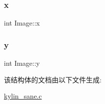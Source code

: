 \mbox{\label{structImage_a7f8f4530212c93856e611030e46c82af}} 
\subsubsection{\texorpdfstring{x}{x}}
{\footnotesize\ttfamily int Image\+::x}

\mbox{\label{structImage_a9b03b7d8dd6f69cb5a444bdd0edd786e}} 
\subsubsection{\texorpdfstring{y}{y}}
{\footnotesize\ttfamily int Image\+::y}



该结构体的文档由以下文件生成\+:\begin{DoxyCompactItemize}
\item 
\hyperlink{kylin__sane_8c}{kylin\+\_\+sane.\+c}\end{DoxyCompactItemize}

